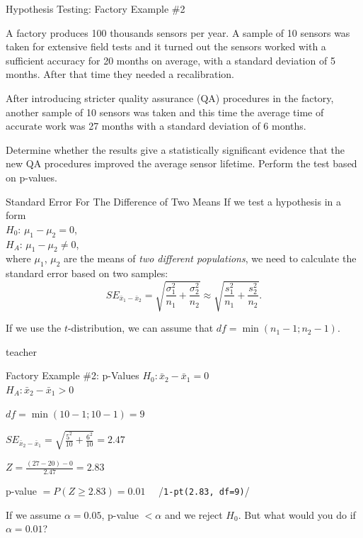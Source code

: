 \begin{frame}{Hypothesis Testing: Factory Example \#2}
    \begin{example}
        \medskip
        A factory produces 100 thousands sensors per year. A sample of 10 sensors was taken for extensive field tests and it turned out the sensors worked with a sufficient accuracy for 20 months on average, with a standard deviation of 5 months. After that time they needed a recalibration.
        
        After introducing stricter quality assurance (QA) procedures in the factory, another sample of 10 sensors was taken and this time the average time of accurate work was 27 months with a standard deviation of 6 months.
        
        Determine whether the results give a statistically significant evidence that the new QA procedures improved the average sensor lifetime. Perform the test based on p-values.
    \end{example}
\end{frame}

\begin{frame}{Standard Error For The Difference of Two Means}
    If we test a hypothesis in a form\\
    $H_0$: $\mu_1 - \mu_2 = 0$,\\
    $H_A$: $\mu_1 - \mu_2 \ne 0$,\\
    where $\mu_1$, $\mu_2$ are the means of \emph{two different populations}, we need to calculate the standard error based on two samples:
    \begin{equation}
    SE_{\bar{x}_1 - \bar{x}_2} = \sqrt{\frac{\sigma_1^2}{n_1} + \frac{\sigma_2^2}{n_2}} \approx \sqrt{\frac{s_1^2}{n_1} + \frac{s_2^2}{n_2}}.
    \end{equation}
    
    If we use the $t$-distribution, we can assume that $df = \min \left(n_1 - 1; n_2 - 1\right)$.
\end{frame}

\begin{shownto}{teacher}
    \begin{frame}{Factory Example \#2: p-Values}
    $H_0 : \bar{x}_2 - \bar{x}_1 = 0$\\    
    $H_A : \bar{x}_2 - \bar{x}_1 > 0$
    
    $df = \min \left( 10 - 1; 10 - 1 \right) = 9$
    
    $SE_{\bar{x}_2 - \bar{x}_1} = \sqrt{\frac{5^2}{10} + \frac{6^2}{10}} = 2.47$
    
    $Z = \frac{(27-20) - 0}{2.47} = 2.83$
    
    p-value $= P(Z \ge 2.83) = 0.01 \quad$ {\small/\texttt{1-pt(2.83, df=9)}/}
    
    If we assume $\alpha = 0.05$, p-value $< \alpha$ and we reject $H_0$. But what would you do if $\alpha = 0.01$?

    \end{frame}
\end{shownto}

